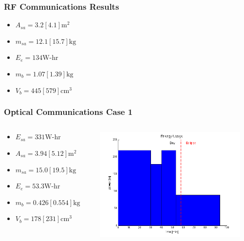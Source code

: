 \documentclass{beamer}
\begin{document}
\begin{frame}
  \frametitle{RF Communications Results}
  \begin{center}
    \begin{itemize}

    \item $A_{sa} = 3.2 [4.1] \text{m}^2$
    \item $m_{sa} = 12.1 [15.7] \text{kg}$

    \item $E_e = 134 \text{W-hr}$
    \item $m_b = 1.07 [1.39] \text{kg}$
    \item $V_b = 445 [579] \text{cm}^3$
    \end{itemize}

  \end{center}
\end{frame}

\begin{frame}
  \frametitle{Optical Communications Case 1}
  \begin{center}
    \begin{columns}
      \begin{column}{0.4\textwidth}
        \begin{itemize}
        \item $E_{sa} = 331 \text{W-hr}$
        \item $A_{sa} = 3.94 [5.12] \text{m}^2 $
        \item $m_{sa} = 15.0 [19.5] \text{kg}$

        \item $E_e = 53.3 \text{W-hr}$
        \item $m_b = 0.426 [0.554] \text{kg}$
        \item $V_b = 178 [231] \text{cm}^3$
        \end{itemize}
      \end{column}
      \begin{column}{0.6\textwidth}
        \includegraphics[width=3in]{img/optical-case-1}
      \end{column}
    \end{columns}
  \end{center}
\end{frame}
\end{document}
